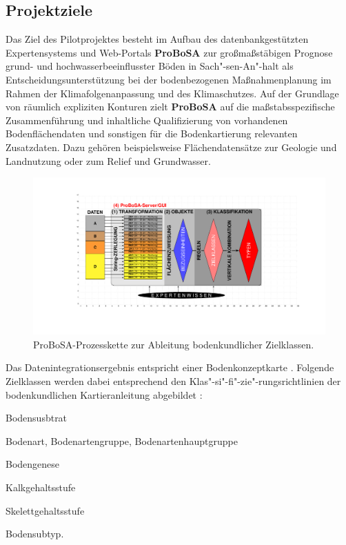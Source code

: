 \subsection{Projektziele}
Das Ziel des Pilotprojektes besteht im Aufbau des datenbankgestützten Expertensystems und Web-Portals \textbf{ProBoSA} zur großmaßstäbigen Prognose grund- und hochwasserbeeinflusster Böden in Sach"-sen-An"-halt als Entscheidungsunterstützung bei der bodenbezogenen Maßnahmenplanung im Rahmen der Klimafolgenanpassung und des Klimaschutzes. Auf der Grundlage von räumlich expliziten Konturen zielt \textbf{ProBoSA}  auf die  maßstabsspezifische Zusammenführung und inhaltliche Qualifizierung von vorhandenen Bodenflächendaten  und sonstigen für die Bodenkartierung relevanten Zusatzdaten. Dazu gehören beispielsweise Flächendatensätze zur Geologie und Landnutzung oder zum Relief und Grundwasser.

\begin{figure}[t]
\centering\includegraphics[width=1\textwidth]{figures/basic-approach.pdf}
\caption{ProBoSA-Prozesskette zur Ableitung bodenkundlicher Zielklassen.}\label{fig:prozesskette}
\end{figure}

Das Datenintegrationsergebnis entspricht einer Bodenkonzeptkarte  \citep[vgl.][]{KA5,Moeller-etal2012catena}. Folgende Zielklassen werden dabei entsprechend den Klas"-si"-fi"-zie"-rungsrichtlinien der bodenkundlichen Kartieranleitung  abgebildet \citep{KA5}:

\begin{compactitem}
\item Bodensusbtrat
\begin{compactitem}
\item Bodenart, Bodenartengruppe, Bodenartenhauptgruppe
\item Bodengenese
\item Kalkgehaltsstufe
\item Skelettgehaltsstufe
\end{compactitem}
\item Bodensubtyp.
\end{compactitem}

